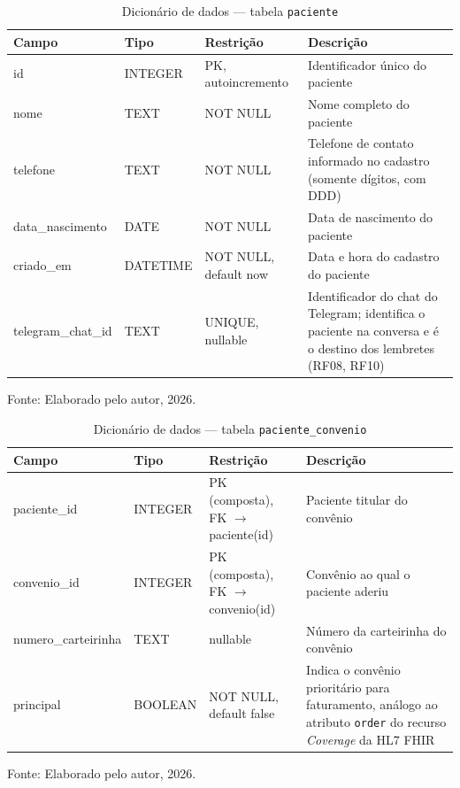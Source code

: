 \documentclass[12pt,a4paper]{extarticle}
\begin{document}
\begin{table}[H]
    \centering
    \caption{Dicionário de dados --- tabela \texttt{paciente}}
    {\small
    \begin{tabularx}{\textwidth}{@{}L{3.3cm} L{1.8cm} L{4.0cm} Y@{}}
        \toprule
        \textbf{Campo} & \textbf{Tipo} & \textbf{Restrição} & \textbf{Descrição} \\
        \midrule
        id & INTEGER & PK, autoincremento & Identificador único do paciente \\
        nome & TEXT & NOT NULL & Nome completo do paciente \\
        telefone & TEXT & NOT NULL & Telefone de contato informado no cadastro (somente dígitos, com DDD) \\
        data\_\allowbreak{}nascimento & DATE & NOT NULL & Data de nascimento do paciente \\
        criado\_\allowbreak{}em & DATETIME & NOT NULL, default now & Data e hora do cadastro do paciente \\
        telegram\_\allowbreak{}chat\_\allowbreak{}id & TEXT & UNIQUE, nullable & Identificador do chat do Telegram; identifica o paciente na conversa e é o destino dos lembretes (RF08, RF10) \\
        \bottomrule
    \end{tabularx}
    }
    \vspace{0.12cm}
    {\raggedright\footnotesize Fonte: Elaborado pelo autor, 2026.\par}
\end{table}

\begin{table}[H]
    \centering
    \caption{Dicionário de dados --- tabela \texttt{paciente\_\allowbreak{}convenio}}
    {\small
    \begin{tabularx}{\textwidth}{@{}L{3.3cm} L{1.8cm} L{4.0cm} Y@{}}
        \toprule
        \textbf{Campo} & \textbf{Tipo} & \textbf{Restrição} & \textbf{Descrição} \\
        \midrule
        paciente\_\allowbreak{}id & INTEGER & PK (composta), FK $\rightarrow$ paciente(id) & Paciente titular do convênio \\
        convenio\_\allowbreak{}id & INTEGER & PK (composta), FK $\rightarrow$ convenio(id) & Convênio ao qual o paciente aderiu \\
        numero\_\allowbreak{}carteirinha & TEXT & nullable & Número da carteirinha do convênio \\
        principal & BOOLEAN & NOT NULL, default false & Indica o convênio prioritário para faturamento, análogo ao atributo \texttt{order} do recurso \textit{Coverage} da HL7 FHIR \\
        \bottomrule
    \end{tabularx}
    }
    \vspace{0.12cm}
    {\raggedright\footnotesize Fonte: Elaborado pelo autor, 2026.\par}
\end{table}
\end{document}
